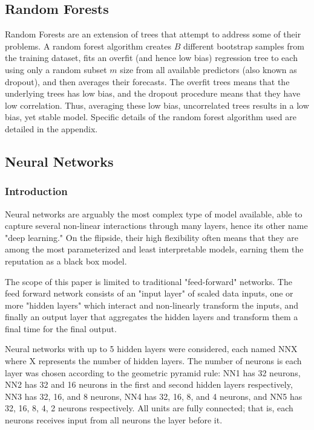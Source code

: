 \documentclass[man, a4paper, biblatex]{article}
\begin{document}
\subsection{Random Forests}
Random Forests are an extension of trees that attempt to address some of their problems. A random forest algorithm creates $B$ different bootstrap samples from the training dataset, fits an overfit (and hence low bias) regression tree to each using only a random subset $m$ size from all available predictors (also known as dropout), and then averages their forecasts. The overfit trees means that the underlying trees has low bias, and the dropout procedure means that they have low correlation. Thus, averaging these low bias, uncorrelated trees results in a low bias, yet stable model. Specific details of the random forest algorithm used are detailed in the appendix.

\subsection{Neural Networks}

\subsubsection{Introduction}

Neural networks are arguably the most complex type of model available, able to capture several non-linear interactions through many layers, hence its other name "deep learning." On the flipside, their high flexibility often means that they are among the most parameterized and least interpretable models, earning them the reputation as a black box model.

The scope of this paper is limited to traditional "feed-forward" networks. The feed forward network consists of an "input layer" of scaled data inputs, one or more "hidden layers" which interact and non-linearly transform the inputs, and finally an output layer that aggregates the hidden layers and transform them a final time for the final output. 

Neural networks with up to 5 hidden layers were considered, each named NNX where X represents the number of hidden layers. The number of neurons is each layer was chosen according to the geometric pyramid rule: NN1 has 32 neurons, NN2 has 32 and 16 neurons in the first and second hidden layers respectively, NN3 has 32, 16, and 8 neurons, NN4 has 32, 16, 8, and 4 neurons, and NN5 has 32, 16, 8, 4, 2 neurons respectively. All units are fully connected; that is, each neurons receives input from all neurons the layer before it.
\end{document}
